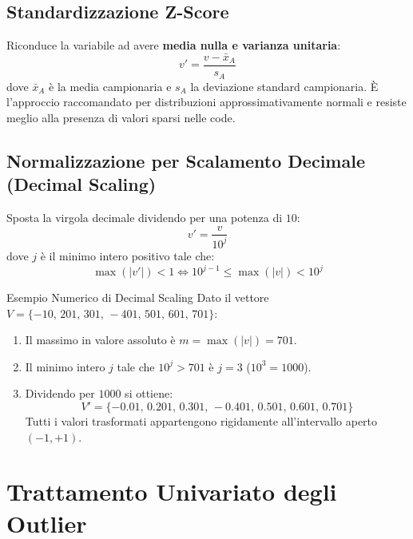 \FloatBarrier
\subsection{Standardizzazione Z-Score}
Riconduce la variabile ad avere \textbf{media nulla e varianza unitaria}:
\begin{equation}
    v' = \frac{v - \bar{x}_A}{s_A}
\end{equation}
dove $\bar{x}_A$ è la media campionaria e $s_A$ la deviazione standard campionaria. È l'approccio raccomandato per distribuzioni approssimativamente normali e resiste meglio alla presenza di valori sparsi nelle code.

\FloatBarrier
\subsection{Normalizzazione per Scalamento Decimale (Decimal Scaling)}
Sposta la virgola decimale dividendo per una potenza di $10$:
\begin{equation}
    v' = \frac{v}{10^j}
\end{equation}
dove $j$ è il minimo intero positivo tale che:
\begin{equation}
    \max(|v'|) < 1 \iff 10^{j-1} \le \max(|v|) < 10^j
\end{equation}

\begin{noteblock}{Esempio Numerico di Decimal Scaling}
Dato il vettore $V = \{-10,\, 201,\, 301,\, -401,\, 501,\, 601,\, 701\}$:
\begin{enumerate}
    \item Il massimo in valore assoluto è $m = \max(|v|) = 701$.
    \item Il minimo intero $j$ tale che $10^j > 701$ è $j=3$ ($10^3 = 1000$).
    \item Dividendo per $1000$ si ottiene:
    \begin{equation}
        V' = \{-0.01,\, 0.201,\, 0.301,\, -0.401,\, 0.501,\, 0.601,\, 0.701\}
    \end{equation}
    Tutti i valori trasformati appartengono rigidamente all'intervallo aperto $(-1, +1)$.
\end{enumerate}
\end{noteblock}

\FloatBarrier
\section{Trattamento Univariato degli Outlier}
\label{sec:dm-univariate-outlier-treatment}


